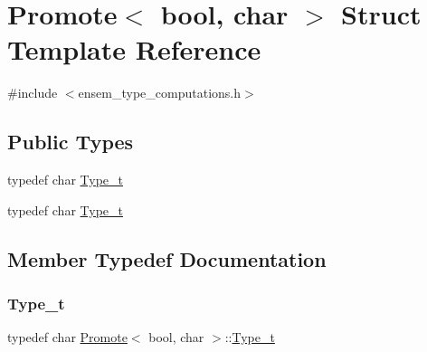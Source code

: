 \hypertarget{structPromote_3_01bool_00_01char_01_4}{}\section{Promote$<$ bool, char $>$ Struct Template Reference}
\label{structPromote_3_01bool_00_01char_01_4}


{\ttfamily \#include $<$ensem\+\_\+type\+\_\+computations.\+h$>$}

\subsection*{Public Types}
\begin{DoxyCompactItemize}
\item 
typedef char \mbox{\hyperlink{structPromote_3_01bool_00_01char_01_4_ae241f014309954a164eb7d94f35e3adc}{Type\+\_\+t}}
\item 
typedef char \mbox{\hyperlink{structPromote_3_01bool_00_01char_01_4_ae241f014309954a164eb7d94f35e3adc}{Type\+\_\+t}}
\end{DoxyCompactItemize}


\subsection{Member Typedef Documentation}
\mbox{\label{structPromote_3_01bool_00_01char_01_4_ae241f014309954a164eb7d94f35e3adc}} 
\subsubsection{\texorpdfstring{Type\_t}{Type\_t}\hspace{0.1cm}{\footnotesize\ttfamily [1/2]}}
{\footnotesize\ttfamily typedef char \mbox{\hyperlink{structPromote}{Promote}}$<$ bool, char $>$\+::\mbox{\hyperlink{structPromote_3_01bool_00_01char_01_4_ae241f014309954a164eb7d94f35e3adc}{Type\+\_\+t}}}

\mbox{\label{structPromote_3_01bool_00_01char_01_4_ae241f014309954a164eb7d94f35e3adc}} 
